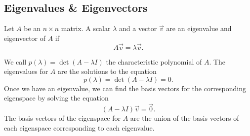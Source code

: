 \subsection{Eigenvalues \& Eigenvectors}
\begin{definition}
	Let $A$ be an $n \times n$ matrix. A scalar $\lambda$ and a vector $\vec{v}$ are an eigenvalue and eigenvector of $A$ if
	\begin{equation*}
		A\vec{v} = \lambda\vec{v}.
	\end{equation*}
\end{definition}
\noindent
We call $p(\lambda) = \det{(A - \lambda I)}$ the characteristic polynomial of $A$. The eigenvalues for $A$ are the solutions to the equation
\begin{equation*}
	p(\lambda) = \det{(A - \lambda I)} = 0.
\end{equation*}
Once we have an eigenvalue, we can find the basis vectors for the corresponding eigenspace by solving the equation
\begin{equation*}
	\left( A - \lambda I \right)\vec{v} = \vec{0}.
\end{equation*}
The basis vectors of the eigenspace for $A$ are the union of the basis vectors of each eigenspace corresponding to each eigenvalue.

